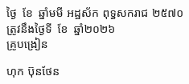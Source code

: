 \documentclass[a4paper,12pt]{article}
\begin{document}
\vspace{8pt}
\Needspace{2.2cm}
\hfill
\begin{minipage}{10.5cm}
  {\centering
    ថ្ងៃ\makebox[16mm]{\dotfill}\ ខែ\makebox[18mm]{\dotfill}\ ឆ្នាំមមី អដ្ឋស័ក ពុទ្ធសករាជ ២៥៧០\\[2pt]
    ត្រូវនឹងថ្ងៃទី\makebox[10mm]{\dotfill}\ ខែ\makebox[18mm]{\dotfill}\ ឆ្នាំ២០២៦\\[3pt]
    {\muol\fontsize{11.5pt}{18pt}\selectfont គ្រូបង្រៀន}\par}
  \vspace{32pt}
  \hfill{\muol\fontsize{11.5pt}{18pt}\selectfont ហុក ប៊ុនថែន}\hspace*{1.4cm}
\end{minipage}
\end{document}
